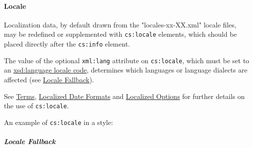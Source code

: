 \hypertarget{locale}{%
\paragraph{Locale}\label{locale}}

Localization data, by default drawn from the "locales-xx-XX.xml" locale
files, may be redefined or supplemented with \texttt{cs:locale}
elements, which should be placed directly after the \texttt{cs:info}
element.

The value of the optional \texttt{xml:lang} attribute on
\texttt{cs:locale}, which must be set to an
\href{http://books.xmlschemata.org/relaxng/ch19-77191.html}{xsd:language
locale code}, determines which languages or language dialects are
affected (see \protect\hyperlink{locale-fallback}{Locale Fallback}).

See \protect\hyperlink{terms}{Terms},
\protect\hyperlink{localized-date-formats}{Localized Date Formats} and
\protect\hyperlink{localized-options}{Localized Options} for further
details on the use of \texttt{cs:locale}.

An example of \texttt{cs:locale} in a style:

\begin{Shaded}
\begin{Highlighting}[]
\NormalTok{\textless{}}\NormalTok{\textgreater{}}
\NormalTok{  \textless{}}\NormalTok{\textgreater{}}
\NormalTok{    \textless{}}\NormalTok{\textgreater{}}
\NormalTok{      \textless{}}\NormalTok{\textgreater{}}
\NormalTok{        \textless{}}\NormalTok{\textgreater{}}
\NormalTok{        \textless{}}\NormalTok{\textgreater{}}
\NormalTok{      \textless{}/}\NormalTok{\textgreater{}}
\NormalTok{    \textless{}/}\NormalTok{\textgreater{}}
\NormalTok{  \textless{}/}\NormalTok{\textgreater{}}
\NormalTok{\textless{}/}\NormalTok{\textgreater{}}
\end{Highlighting}
\end{Shaded}

\hypertarget{locale-fallback}{%
\subparagraph{Locale Fallback}\label{locale-fallback}}

